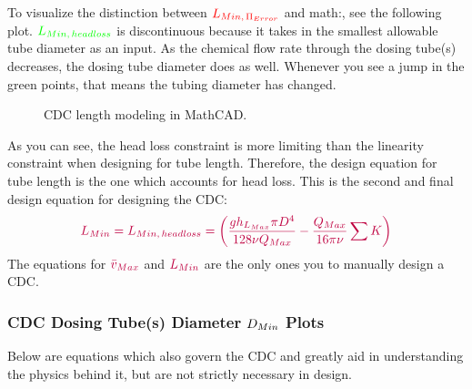 \documentclass[letterpaper,10pt,english]{sphinxmanual}
\let\sphinxpxdimen\pdfpxdimen\else\newdimen\sphinxpxdimen
\begin{document}
To visualize the distinction between \(\color{red}{  L_{Min, \, \Pi_{Error}}}\) and math:, see the following plot. \(\color{green}{ L_{Min, \, head loss}}\) is discontinuous because it takes in the smallest allowable tube diameter as an input. As the chemical flow rate through the dosing tube(s) decreases, the dosing tube diameter does as well. Whenever you see a jump in the green points, that means the tubing diameter has changed.

\begin{figure}[htbp]
\centering
\capstart

\noindent\sphinxincludegraphics[width=600\sphinxpxdimen]{{CDC_length_model}.png}
\caption{CDC length modeling in MathCAD.}\label{\detokenize{Flow_Control_and_Measurement/FCM_Derivations:id7}}\label{\detokenize{Flow_Control_and_Measurement/FCM_Derivations:cdc-length-model}}\end{figure}

As you can see, the head loss constraint is more limiting than the linearity constraint when designing for tube length. Therefore, the design equation for tube length is the one which accounts for head loss. This is the second and final design equation for designing the CDC:
\begin{equation}\label{equation:Flow_Control_and_Measurement/FCM_Derivations:Flow_Control_and_Measurement/FCM_Derivations:37}
\begin{split}\color{purple}{
L_{Min} = L_{Min, \, head loss} = \left( \frac{g h_{L_{Max}} \pi D^4}{128 \nu Q_{Max}} - \frac{Q_{Max}}{16 \pi \nu} \sum{K} \right)
}\end{split}
\end{equation}
The equations for \(\color{purple}{\bar v_{Max}}\) and \(\color{purple}{L_{Min}}\) are the only ones you  to manually design a CDC.


\subsubsection{CDC Dosing Tube(s) Diameter \protect\(D_{Min}\protect\) Plots}
\label{\detokenize{Flow_Control_and_Measurement/FCM_Derivations:cdc-dosing-tube-s-diameter-plots}}
Below are equations which also govern the CDC and greatly aid in understanding the physics behind it, but are not strictly necessary in design.
\end{document}
